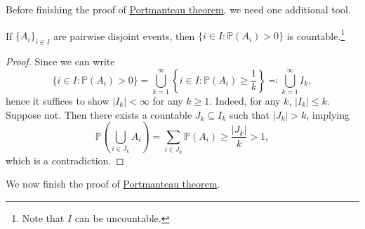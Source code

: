 Before finishing the proof of \hyperref[thm:Portmanteau]{Portmanteau theorem}, we need one additional tool.

\begin{lemma}\label{lma:countable-positive-disjoint-event}
	If \(\{ A_i \} _{i\in I}\) are pairwise disjoint events, then \(\{ i \in I \colon \mathbb{P} (A_i) > 0 \} \) is countable.\footnote{Note that \(I\) can be uncountable.}
\end{lemma}
\begin{proof}
	Since we can write
	\[
		\{ i \in I \colon \mathbb{P} (A_i) >0 \}
		= \bigcup_{k=1}^{\infty} \left\{ i \in I \colon \mathbb{P} (A_i) \geq \frac{1}{k} \right\}
		\eqqcolon \bigcup_{k=1}^{\infty} I_k,
	\]
	hence it suffices to show \(\vert I_k \vert < \infty \) for any \(k \geq 1\). Indeed, for any \(k\), \(\vert I_k \vert \leq k\). Suppose not. Then there exists a countable \(J_k \subseteq I_k\) such that \(\vert J_k \vert > k\), implying
	\[
		\mathbb{P} \left( \bigcup_{i\in J_k} A_i \right)
		= \sum_{i\in J_k} \mathbb{P} (A_i)
		\geq \frac{\vert J_k \vert }{k}
		> 1,
	\]
	which is a contradiction.
\end{proof}

We now finish the proof of \hyperref[thm:Portmanteau]{Portmanteau theorem}.

